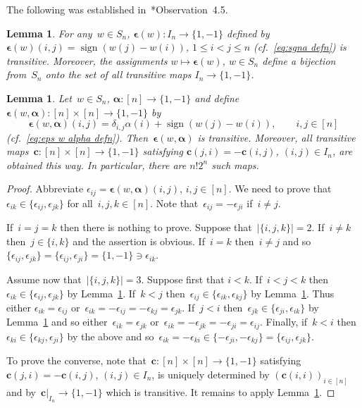 \documentclass[12pt, reqno]{amsart}
\newtheorem{lemma}[theorem]{Lemma}
\theoremstyle{definition}
\numberwithin{equation}{section}
\DeclareMathOperator{\sign}{sign}
\newcommand{\sgna}[1]{\boldsymbol{\epsilon}(#1)}
\begin{document}
The following was established in~\cite{ABGJ}*{Observation~4.5}.
\begin{lemma}\label{lem:trans sign}
For any~$w\in S_n$, $\sgna{w}:I_n\to \{1,-1\}$ 
defined by
$\sgna{w}(i,j)=\sign(w(j)-w(i))$, $1\le i<j\le n$
(cf.~\eqref{eq:sgna defn}) is transitive. Moreover, the assignments 
$w\mapsto \sgna{w}$, $w\in S_n$ define a bijection from~$S_n$
onto the set of all transitive maps $I_n\to \{1,-1\}$.
\end{lemma}
\begin{lemma}\label{lem:In trans to trans}
Let~$w\in S_n$, $\boldsymbol{\alpha}:[n]\to \{1,-1\}$ and define $\boldsymbol\epsilon(w,\boldsymbol{\alpha}):[n]\times[n]\to \{1,-1\}$ by
$$
\boldsymbol\epsilon(w,\boldsymbol{\alpha})(i,j)=\delta_{i,j}\alpha(i)+
\sign(w(j)-w(i)),\qquad i,j\in [n]
$$
(cf.~\eqref{eq:eps w alpha defn}).
Then~$\boldsymbol\epsilon(w,\boldsymbol{\alpha})$ is transitive. Moreover,
all transitive maps~$\mathbf c:[n]\times[n]\to\{1,-1\}$ satisfying
$\mathbf c(j,i)=-\mathbf c(i,j)$, $(i,j)\in I_n$, are obtained this way.
In particular, there are $n! 2^n$ such maps.
\end{lemma}
\begin{proof}
Abbreviate $\epsilon_{ij}=\boldsymbol\epsilon(w,\boldsymbol{\alpha})(i,j)$,
$i,j\in [n]$. We need to prove that~$\epsilon_{ik}\in\{\epsilon_{ij},
\epsilon_{jk}\}$ for all~$i,j,k\in [n]$. Note that~$\epsilon_{ij}=-\epsilon_{ji}$
if~$i\not=j$. 

If~$i=j=k$ then there is nothing to prove. Suppose that~$|\{i,j,k\}|=2$. If~$i\not=k$ then~$j\in\{i,k\}$ and the assertion is obvious.
If~$i=k$ then~$i\not=j$ and so~$\{\epsilon_{ij},\epsilon_{jk}\}=\{\epsilon_{ij},\epsilon_{ji}\}
=\{1,-1\}\ni\epsilon_{ik}$.

Assume now that~$|\{i,j,k\}|=3$. Suppose first that $i<k$. If~$i<j<k$ then~$\epsilon_{ik}\in\{\epsilon_{ij},\epsilon_{jk}\}$ by Lemma~\ref{lem:trans sign}.
If~$k<j$ then~$\epsilon_{ij}\in \{\epsilon_{ik},\epsilon_{kj}\}$ by Lemma~\ref{lem:trans sign}. Thus either
$\epsilon_{ik}=\epsilon_{ij}$ or~$\epsilon_{ik}=-\epsilon_{ij}=-\epsilon_{kj}
=\epsilon_{jk}$. 
If~$j<i$ then~$\epsilon_{jk}\in\{\epsilon_{ji},\epsilon_{ik}\}$ by Lemma~\ref{lem:trans sign} and so either~$\epsilon_{ik}=\epsilon_{jk}$
or~$\epsilon_{ik}=-\epsilon_{jk}=-\epsilon_{ji}=\epsilon_{ij}$.
Finally, if~$k<i$ then $\epsilon_{ki}\in \{ \epsilon_{kj},\epsilon_{ji}\}$ by the above and so~$\epsilon_{ik}=-\epsilon_{ki}\in \{-\epsilon_{ji},-\epsilon_{kj}\}=
\{\epsilon_{ij},\epsilon_{jk}\}$.

To prove the converse, note that~$\mathbf c:[n]\times[n]\to \{1,-1\}$
satisfying~$\mathbf c(j,i)=-\mathbf c(i,j)$, $(i,j)\in I_n$,  
is uniquely determined by $(\mathbf c(i,i))_{i\in[n]}$ and
by~$\mathbf c|_{I_n}\to \{1,-1\}$ which is transitive. It remains to apply Lemma~\ref{lem:trans sign}.
\end{proof}
\end{document}
